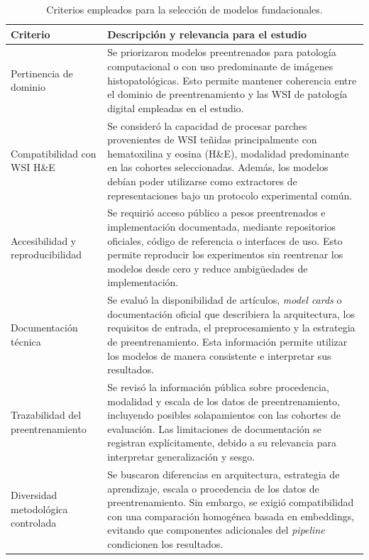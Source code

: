 \begin{table}[htbp]
\centering
\caption{Criterios empleados para la selección de modelos fundacionales.}
\label{tab:criterios_seleccion_modelos}
\small
\renewcommand{\arraystretch}{1.12}
\begin{tabular}{p{3.7cm} p{10.3cm}}
\toprule
\textbf{Criterio} & \textbf{Descripción y relevancia para el estudio} \\
\midrule

Pertinencia de dominio &
Se priorizaron modelos preentrenados para patología computacional o con uso predominante de imágenes histopatológicas. Esto permite mantener coherencia entre el dominio de preentrenamiento y las WSI de patología digital empleadas en el estudio. \\

Compatibilidad con WSI H\&E &
Se consideró la capacidad de procesar parches provenientes de WSI teñidas principalmente con hematoxilina y eosina (H\&E), modalidad predominante en las cohortes seleccionadas. Además, los modelos debían poder utilizarse como extractores de representaciones bajo un protocolo experimental común. \\

Accesibilidad y reproducibilidad &
Se requirió acceso público a pesos preentrenados e implementación documentada, mediante repositorios oficiales, código de referencia o interfaces de uso. Esto permite reproducir los experimentos sin reentrenar los modelos desde cero y reduce ambigüedades de implementación. \\

Documentación técnica &
Se evaluó la disponibilidad de artículos, \textit{model cards} o documentación oficial que describiera la arquitectura, los requisitos de entrada, el preprocesamiento y la estrategia de preentrenamiento. Esta información permite utilizar los modelos de manera consistente e interpretar sus resultados. \\

Trazabilidad del preentrenamiento &
Se revisó la información pública sobre procedencia, modalidad y escala de los datos de preentrenamiento, incluyendo posibles solapamientos con las cohortes de evaluación. Las limitaciones de documentación se registran explícitamente, debido a su relevancia para interpretar generalización y sesgo. \\

Diversidad metodológica controlada &
Se buscaron diferencias en arquitectura, estrategia de aprendizaje, escala o procedencia de los datos de preentrenamiento. Sin embargo, se exigió compatibilidad con una comparación homogénea basada en embeddings, evitando que componentes adicionales del \textit{pipeline} condicionen los resultados. \\


\end{tabular}
\end{table}
